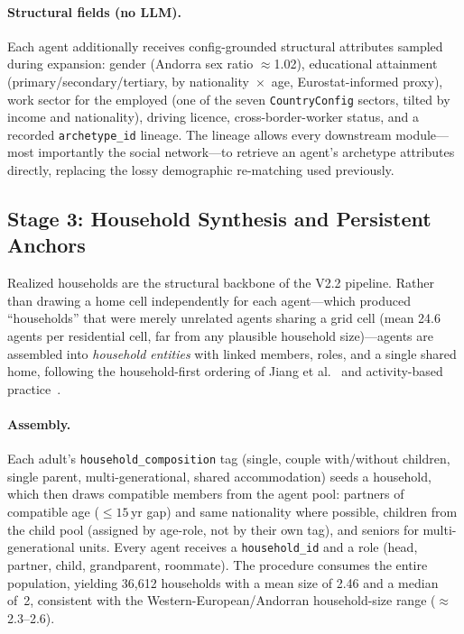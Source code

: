 \documentclass[a4paper,12pt]{article}
\begin{document}
\paragraph{Structural fields (no LLM).}
Each agent additionally receives config-grounded structural attributes sampled
during expansion: gender (Andorra sex ratio $\approx$1.02), educational attainment
(primary/secondary/tertiary, by nationality~$\times$~age, Eurostat-informed proxy),
work sector for the employed (one of the seven \texttt{CountryConfig} sectors, tilted
by income and nationality), driving licence, cross-border-worker status, and a
recorded \texttt{archetype\_id} lineage. The lineage allows every downstream
module---most importantly the social network---to retrieve an agent's archetype
attributes directly, replacing the lossy demographic re-matching used previously.

\subsection{Stage 3: Household Synthesis and Persistent Anchors}
\label{subsec:households}

Realized households are the structural backbone of the V2.2 pipeline. Rather than
drawing a home cell independently for each agent---which produced ``households'' that
were merely unrelated agents sharing a grid cell (mean 24.6 agents per residential
cell, far from any plausible household size)---agents are assembled into
\emph{household entities} with linked members, roles, and a single shared home,
following the household-first ordering of Jiang et al.~\cite{jiang2022synthetic} and
activity-based practice~\cite{axhausen2016population}.

\paragraph{Assembly.}
Each adult's \texttt{household\_composition} tag (single, couple with/without
children, single parent, multi-generational, shared accommodation) seeds a household,
which then draws compatible members from the agent pool: partners of compatible age
($\leq 15$\,yr gap) and same nationality where possible, children from the child
pool (assigned by age-role, not by their own tag), and seniors for
multi-generational units. Every agent receives a \texttt{household\_id} and a role
(head, partner, child, grandparent, roommate). The procedure consumes the entire
population, yielding 36{,}612 households with a mean size of 2.46 and a median of~2,
consistent with the Western-European/Andorran household-size range
($\approx$2.3--2.6).
\end{document}
